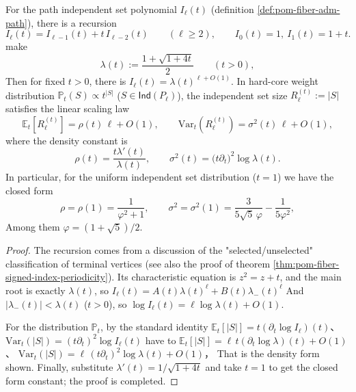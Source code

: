 \begin{proposition}\label{prop:pom-path-indset-thermo-constants}
For the path independent set polynomial \(I_{\ell}(t)\) (definition \ref{def:pom-fiber-adm-path}), there is a recursion
\[
I_{\ell}(t)=I_{\ell-1}(t)+t\,I_{\ell-2}(t)\qquad(\ell\ge 2),
\qquad
I_0(t)=1,\ I_1(t)=1+t.
\]
make
\[
\lambda(t):=\frac{1+\sqrt{1+4t}}{2}\qquad(t>0),
\]
Then for fixed \(t>0\), there is \(I_{\ell}(t)=\lambda(t)^{\ell+O(1)}\).
In hard-core weight distribution
\(
\mathbb P_t(S)\propto t^{|S|}
\)
(\(S\in\mathsf{Ind}(P_{\ell})\)), the independent set size \(R_{\ell}^{(t)}:=|S|\) satisfies the linear scaling law
\[
\mathbb{E}_t[R_{\ell}^{(t)}]=\rho(t)\,\ell+O(1),\qquad
\mathrm{Var}_t(R_{\ell}^{(t)})=\sigma^2(t)\,\ell+O(1),
\]
where the density constant is
\[
\rho(t)=\frac{t\lambda'(t)}{\lambda(t)},\qquad
\sigma^2(t)=\bigl(t\partial_t\bigr)^2\log\lambda(t).
\]
In particular, for the uniform independent set distribution (\(t=1\)) we have the closed form
\[
\rho=\rho(1)=\frac{1}{\varphi^2+1},
\qquad
\sigma^2=\sigma^2(1)=\frac{3}{5\sqrt5\,\varphi}-\frac{1}{5\varphi^2},
\]
Among them \(\varphi=(1+\sqrt5)/2\).
\end{proposition}
\begin{proof}
The recursion comes from a discussion of the "selected/unselected" classification of terminal vertices (see also the proof of theorem \ref{thm:pom-fiber-signed-index-periodicity}).
Its characteristic equation is \(z^2=z+t\), and the main root is exactly \(\lambda(t)\), so
\(
I_{\ell}(t)=A(t)\lambda(t)^{\ell}+B(t)\lambda_-(t)^{\ell}
\)
And \(|\lambda_-(t)|<\lambda(t)\) (\(t>0\)), so \(\log I_{\ell}(t)=\ell\log\lambda(t)+O(1)\).
\par
For the distribution \(\mathbb P_t\), by the standard identity
\(
\mathbb E_t[|S|]=t(\partial_t\log I_{\ell})(t)
\)、
\(
\mathrm{Var}_t(|S|)=(t\partial_t)^2\log I_{\ell}(t)
\)
have to
\(
\mathbb E_t[|S|]=\ell\,t(\partial_t\log\lambda)(t)+O(1)
\)、
\(
\mathrm{Var}_t(|S|)=\ell\,(t\partial_t)^2\log\lambda(t)+O(1)
\)，
That is the density form shown.
Finally, substitute \(\lambda'(t)=1/\sqrt{1+4t}\) and take \(t=1\) to get the closed form constant; the proof is completed.
\end{proof}

